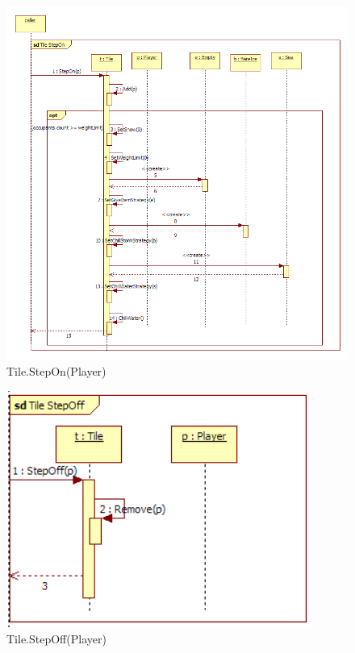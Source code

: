 \begin{figure}[H]
	\begin{center}
		\includegraphics[width=15cm]{chapters/chapter03/seqdiag/Tile_StepOn.png}
		\caption{Tile.StepOn(Player)}
		\label{fig:TileStepOn}
	\end{center}
\end{figure}
\begin{figure}[H]
	\begin{center}
		\includegraphics[width=10cm]{chapters/chapter03/seqdiag/Tile_StepOff.png}
		\caption{Tile.StepOff(Player)}
		\label{fig:TileStepOff}
	\end{center}
\end{figure}
